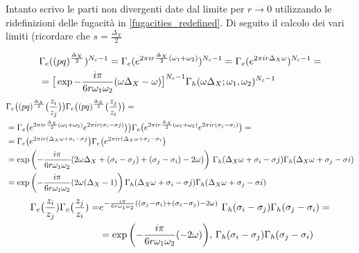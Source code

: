 \documentclass[a4paper,12pt]{article}
\begin{document}
Intanto scrivo le parti non divergenti date dal limite per $ r \rightarrow 0$ utilizzando le ridefinizioni delle fugacità in \ref{fugacities_redefined}. Di seguito il calcolo dei vari limiti (ricordare che $ s = \frac{\Delta_X}{2}$


\begin{align*}
& \Gamma_e((pq)^{\frac{\Delta_X}{2}})^{N_c -1} =
\Gamma_e( e^{2 \pi i r  {\Delta_X \over 2} (\omega_1 + \omega_2)})^{N_c-1} =  \Gamma_e( e^{2 \pi i r  \Delta_X \omega })^{N_c-1} = \\
&=\big[ \exp{- \frac{i \pi} {6 r \omega_1 \omega_2 }  ( \omega \Delta_X - \omega) }\big]^{N_c-1} \Gamma_h ( \omega \Delta_X ; \omega_1, \omega_2)^{N_c-1}
\end{align*}
 \begin{align*}
 & \Gamma_e\big( (pq)^{\frac{\Delta_X}{2}} \big( { z_i \over z_j} \big) \big) \Gamma_e \big( (pq)^{\frac{\Delta_X}{2}} \big( { z_j \over z_i} \big) \big) = \\
&= \Gamma_e\big( e^{2 \pi i r \frac{\Delta_X}{2} (\omega_1 + \omega_2)} e^{ 2 \pi  i r (\sigma_i - \sigma j)} \big) \big) \Gamma_e \big( e^{ 2 \pi i r \frac{\Delta_X}{2} (\omega_1 + \omega_2)}  e^{ 2 \pi i r (\sigma_j - \sigma_i)} \big) =  \\
&= \Gamma_e\big( e^{2 \pi  i r (\Delta_X \omega +\sigma_i - \sigma j} \big) \Gamma_e \big(  e^{2 \pi  i r (\Delta_X \omega +\sigma_j - \sigma_i} \big) \\
 & = \exp \bigg( {- \frac{i \pi} {6 r \omega_1 \omega_2 }  ( 2 \omega \Delta_X + (\sigma_i - \sigma_j)+(\sigma_j - \sigma_i) - 2 \omega) }\bigg)\, \, \Gamma_h ( \Delta_X \omega + \sigma_i - \sigma j ) \Gamma_h ( \Delta_X \omega + \sigma_j - \sigma i) \\
 & = \exp\bigg({- \frac{i \pi} {6 r \omega_1 \omega_2 }  ( 2 \omega (\Delta_X - 1) }\bigg)  \, \Gamma_h ( \Delta_X \omega + \sigma_i - \sigma j ) \Gamma_h ( \Delta_X \omega + \sigma_j - \sigma i) 
\end{align*}
\begin{align*}
  \Gamma_e\big( {z_i \over z_j})\Gamma_e\big( {z_j \over z_i}) = &e^{- \frac{i \pi} {6 r \omega_1 \omega_2 }  ( (\sigma_j - \sigma_i) + (\sigma_i- \sigma_j) - 2 \omega)} \, \, \Gamma_h (  \sigma_i - \sigma_j) \Gamma_h (  \sigma_j - \sigma_i) =\\
& = \exp \bigg( {- \frac{i \pi} {6 r \omega_1 \omega_2 }  ( - 2 \omega)}  \bigg) , \, \Gamma_h (  \sigma_i - \sigma_j) \Gamma_h (  \sigma_j - \sigma_i)
\end{align*}
\end{document}
